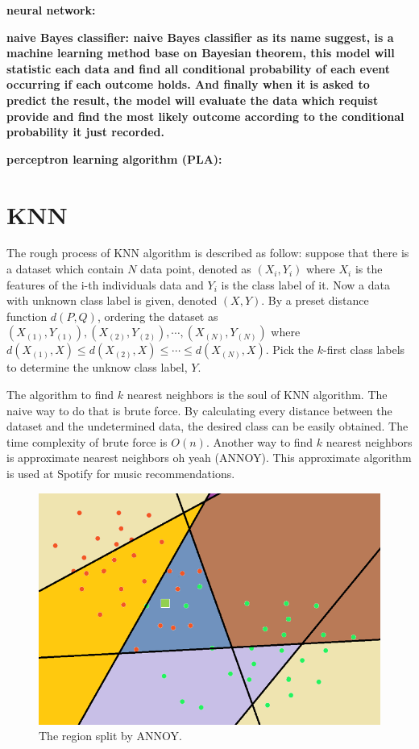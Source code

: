 \documentclass[twocolumn,10pt]{article}
\begin{document}
  \bf{neural network}: 

  \bf{naive Bayes classifier}: \rm{naive Bayes classifier} as its name suggest, is a machine learning method base on Bayesian theorem, this model will statistic each data and find all conditional probability of each event occurring if each outcome holds. And finally when it is asked to predict the result, the model will evaluate the data which requist provide and find the most likely outcome according to the conditional probability it just recorded. 

  \bf{perceptron learning algorithm (PLA)}: 

\section{KNN}
  \rm{The} rough process of KNN algorithm is described as follow: suppose that there is a dataset which contain $N$ data point, denoted as 
  $(X_i,Y_i)$ where $X_i$ is the features of the i-th individuals data and $Y_i$ is the class label of it. Now 
  a data with unknown class label is given, denoted $(X, Y)$. By a preset distance function $d(P, Q)$, ordering the dataset 
  as $(X_{(1)}, Y_{(1)}), (X_{(2)}, Y_{(2)}), \cdots, (X_{(N)}, Y_{(N)})$ where $d(X_{(1)}, X)\leq d(X_{(2)}, X)\leq\cdots\leq d(X_{(N)}, X)$. 
  Pick the $k$-first class labels to determine the unknow class label, $Y$.

  The algorithm to find $k$ nearest neighbors is the soul of KNN algorithm. The naive way to do that is brute force. By calculating every 
  distance between the dataset and the undetermined data, the desired class can be easily obtained. The time complexity of brute force is $O(n)$. 
  Another way to find $k$ nearest neighbors is approximate nearest neighbors oh yeah (ANNOY). This approximate algorithm is used at Spotify 
  for music recommendations. 
  \begin{figure}[htb]
    \centering
    \includegraphics[scale=0.5]{assets/ANNOY-split.png}
    \caption{The region split by ANNOY.}
    \label{fig:ANNOY_split}
  \end{figure}
\end{document}
